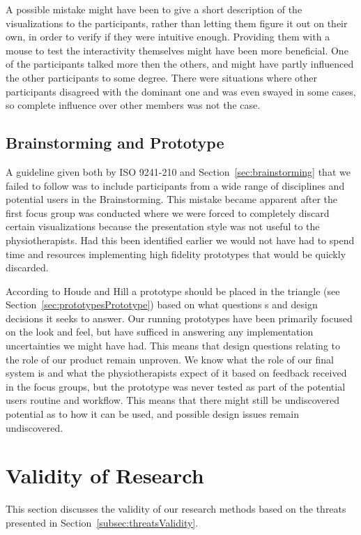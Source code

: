 A possible mistake might have been to give a short description of the visualizations to the participants, rather than letting them figure it out on their own, in order to verify if they were intuitive enough. Providing them with a mouse to test the interactivity themselves might have been more beneficial. One of the participants talked more then the others, and might have partly influenced the other participants to some degree. There were situations where other participants disagreed with the dominant one and was even swayed in some cases, so complete influence over other members was not the case.

\subsection{Brainstorming and Prototype}
A guideline given both by ISO 9241-210 and Section~\ref{sec:brainstorming} that we failed to follow was to include participants from a wide range of disciplines and potential users in the Brainstorming. This mistake became apparent after the first focus group was conducted where we were forced to completely discard certain visualizations because the presentation style was not useful to the physiotherapists. Had this been identified earlier we would not have had to spend time and resources implementing high fidelity prototypes that would be quickly discarded.

According to Houde and Hill a prototype should be placed in the triangle (see Section~\ref{sec:prototypesPrototype}) based on what questions s and design decisions it seeks to answer. Our running prototypes have been primarily focused on the look and feel, but have sufficed in answering any implementation uncertainties we might have had. This means that design questions relating to the role of our product remain unproven. We know what the role of our final system is and what the physiotherapists expect of it based on feedback received in the focus groups, but the prototype was never tested as part of the potential users routine and workflow. This means that there might still be undiscovered potential as to how it can be used, and possible design issues remain undiscovered.

\section{Validity of Research}
This section discusses the validity of our research methods based on the threats presented in Section~\ref{subsec:threatsValidity}.


